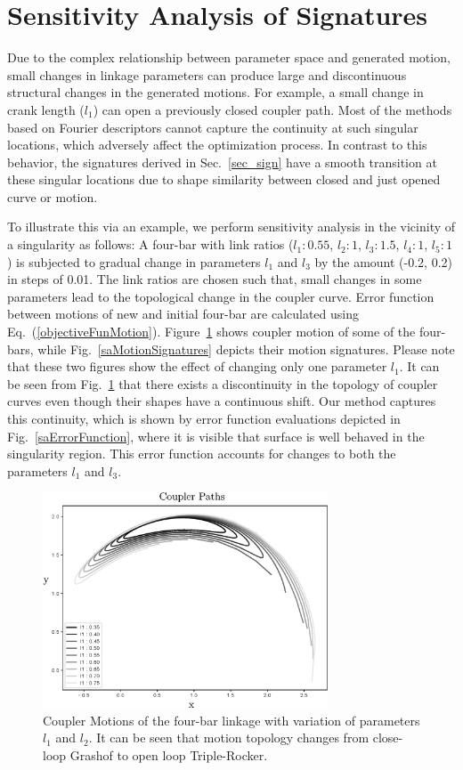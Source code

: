 \documentclass[twocolumn,10pt]{asme2ej}
\newcommand{\req}[1]{(\ref{#1})}
\begin{document}
\section{Sensitivity Analysis of Signatures}\label{sec_SA}
Due to the complex relationship between parameter space and generated motion, small changes in linkage parameters can produce large and discontinuous structural changes in the generated motions.
For example, a small change in crank length ($l_1$) can open a previously closed coupler path.
Most of the methods based on Fourier descriptors cannot capture the continuity at such singular locations, which adversely affect the optimization process.
In contrast to this behavior, the signatures derived in Sec.~\ref{sec_sign} have a smooth transition at these singular locations due to shape similarity between closed and just opened curve or motion.

To illustrate this via an example, we perform sensitivity analysis in the vicinity of a singularity as follows:
A four-bar with link ratios ($l_1:0.55$, $l_2:1$, $l_3:1.5$, $l_4:1$, $l_5:1$) is subjected to gradual change in parameters $l_1$ and $l_3$ by the amount (-0.2, 0.2) in steps of 0.01.
The link ratios are chosen such that, small changes in some parameters lead to the topological change in the coupler curve.
Error function between motions of new and initial four-bar are calculated using Eq.~\req{objectiveFunMotion}. Figure~\ref{saCouplerCurves} shows coupler motion of some of the four-bars, while Fig.~\ref{saMotionSignatures} depicts their motion signatures. Please note that these two figures show the effect of changing only one parameter $l_1$.
It can be seen from Fig.~\ref{saCouplerCurves} that there exists a discontinuity in the topology of coupler curves even though their shapes have a continuous shift.
Our method captures this continuity, which is shown by error function evaluations depicted in Fig.~\ref{saErrorFunction}, where it is visible that surface is well behaved in the singularity region. This error function accounts for changes to both the parameters $l_1$ and $l_3$.

\begin{figure}
\centering
\includegraphics[width=240pt]{figure/fig_sa_coupler_curves.eps}
  \caption{Coupler Motions of the four-bar linkage with variation of parameters $l_1$ and $l_2$. It can be seen that motion topology changes from close-loop Grashof to open loop Triple-Rocker.}
\label{saCouplerCurves}
\end{figure}
\end{document}
